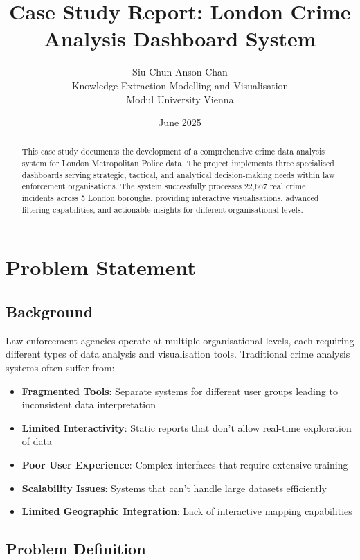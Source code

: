 \documentclass[12pt,a4paper]{article}
\title{\textbf{Case Study Report: London Crime Analysis Dashboard System}}
\author{Siu Chun Anson Chan \\ Knowledge Extraction Modelling and Visualisation \\ Modul University Vienna}
\date{June 2025}
\begin{document}
\maketitle
\thispagestyle{fancy}

\begin{abstract}
This case study documents the development of a comprehensive crime data analysis system for London Metropolitan Police data. The project implements three specialised dashboards serving strategic, tactical, and analytical decision-making needs within law enforcement organisations. The system successfully processes 22,667 real crime incidents across 5 London boroughs, providing interactive visualisations, advanced filtering capabilities, and actionable insights for different organisational levels.
\end{abstract}

\tableofcontents
\newpage

\section{Problem Statement}

\subsection{Background}

Law enforcement agencies operate at multiple organisational levels, each requiring different types of data analysis and visualisation tools. Traditional crime analysis systems often suffer from:

\begin{itemize}
    \item \textbf{Fragmented Tools}: Separate systems for different user groups leading to inconsistent data interpretation
    \item \textbf{Limited Interactivity}: Static reports that don't allow real-time exploration of data
    \item \textbf{Poor User Experience}: Complex interfaces that require extensive training
    \item \textbf{Scalability Issues}: Systems that can't handle large datasets efficiently
    \item \textbf{Limited Geographic Integration}: Lack of interactive mapping capabilities
\end{itemize}

\subsection{Problem Definition}
\end{document}
